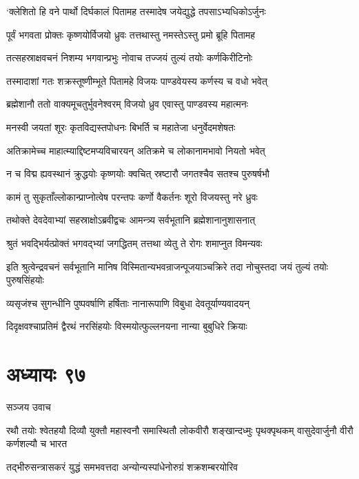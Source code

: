 \twolineshloka
{`क्लेशितो हि वने पार्थो दिर्घकालं पितामह}
{तस्मादेष जयेद्युद्धे तपसाऽभ्यधिकोऽर्जुनः}


\twolineshloka
{पूर्वं भगवता प्रोक्तः कृष्णयोर्विजयो ध्रुवः}
{तत्तथास्तु नमस्तेऽस्तु प्रमो ब्रूहि पितामह}


\twolineshloka
{तत्सहस्राक्षवचनं निशम्य भगवान्प्रभुः}
{नोवाच तज्जयं तुल्यं तयोः कर्णकिरीटिनोः}


\twolineshloka
{तस्मादाशां गतः शक्रस्तूष्णीम्भूते पितामहे}
{विजयः पाण्डवेयस्य कर्णस्य च वधो भवेत्}


\twolineshloka
{ब्रह्मेशानौ ततो वाक्यमूचतुर्भुवनेश्वरम्}
{विजयो ध्रुव एवास्तु पाण्डवस्य महात्मनः}


\twolineshloka
{मनस्वी जयतां शूरः कृतविद्यस्तपोधनः}
{बिभर्ति च महातेजा धनुर्वेदमशेषतः}


\twolineshloka
{अतिक्रामेच्च माहात्म्याद्दिष्टमप्यविचारयन्}
{अतिक्रमे च लोकानामभावो नियतो भवेत्}


\twolineshloka
{न च विद्म ह्यवस्थानं क्रुद्धयोः कृष्णयोः क्वचित्}
{स्रष्टारौ जगतश्चैव सतश्च पुरुषर्षभौ}


\twolineshloka
{कामं तु सुकृताँल्लोकान्प्राप्नोत्वेष परन्तपः}
{कर्णो वैकर्तनः शूरो विजयस्तु नरे ध्रुवः}


\twolineshloka
{तथोक्ते देवदेवाभ्यां सहस्राक्षोऽब्रवीद्वचः}
{आमन्त्र्य सर्वभूतानि ब्रह्मेशानानुशासनात्}


\twolineshloka
{श्रुतं भवद्भिर्यत्प्रोक्तं भगवद्भ्यां जगद्धितम्}
{तत्तथा व्येतु ते रोगः शमाप्नुत विमन्यवः}


\threelineshloka
{इति श्रुत्वेन्द्रवचनं सर्वभूतानि मानिष}
{विस्मितान्यभवन्राजन्पूजयाञ्चक्रिरे तदा}
{नोचुस्तदा जयं तुल्यं तयोः पुरुषसिंहयोः}


\twolineshloka
{व्यसृजंश्च सुगन्धीनि पुष्पवर्षाणि हर्षिताः}
{नानारूपाणि विबुधा देवतूर्याण्यवादयन्}


\twolineshloka
{दिदृक्षवश्चाप्रतिमं द्वैरथं नरसिंहयोः}
{विस्मयोत्फुल्लनयना नान्या बुबुधिरे क्रियाः}


\chapter{अध्यायः ९७}
\twolineshloka
{सञ्जय उवाच}
{}


\threelineshloka
{रथौ तयोः श्वेतहयौ दिव्यौ युक्तौ महास्वनौ}
{समास्थितौ लोकवीरौ शङ्खान्दध्मुः पृथक्पृथकम्}
{वासुदेवार्जुनौ वीरौ कर्णशल्यौ च भारत}


\twolineshloka
{तद्भीरुसन्त्रासकरं युद्धं समभवत्तदा}
{अन्योन्यस्पांधेनोरुग्रं शक्रशम्बरयोरिव}


